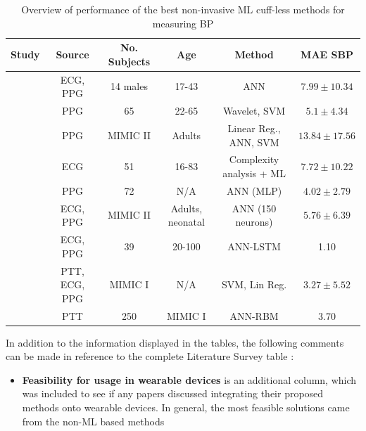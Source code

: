 \begin{landscape}
    \begin{table}[H]
        \caption{Overview of performance of  the best non-invasive ML cuff-less methods for measuring BP}
        \begin{tabular}{|c|c|c|c|c|c|}
        \hline
        \textbf{Study} & \textbf{Source} & \textbf{No. Subjects} & \textbf{Age} & \textbf{Method} & \textbf{MAE SBP} \\ \hline
        \cite{Yang2020} & ECG, PPG & 14 males & 17-43 & ANN & $7.99 \pm 10.34$\\
        \cite{Gao2016} & PPG & 65 & 22-65 & Wavelet, SVM & $5.1 \pm 4.34$\\
        \cite{Kachuee2015} & PPG & MIMIC II & Adults & Linear Reg., ANN, SVM &  $13.84\pm  17.56$\\
        \cite{Simjanoska20182} & ECG & 51 & 16-83 & Complexity analysis + ML &  $7.72 \pm  10.22$\\ 
        \cite{Wang2018} & PPG & 72 & N/A & ANN (MLP) & $4.02 \pm 2.79$\\
        \cite{Pradenas2020} & ECG, PPG & MIMIC II & Adults,  neonatal & ANN (150 neurons) & $5.76 \pm 6.39$\\
        \cite{Tanveer2018} & ECG, PPG & 39 & 20-100 & ANN-LSTM & 1.10\\
        \cite{Chen2019} & PTT, ECG, PPG & MIMIC I & N/A & SVM, Lin Reg. & $3.27 \pm 5.52$\\ 
        \cite{Ripoll2019} & PTT & 250 & MIMIC I & ANN-RBM & 3.70\\\hline
        \end{tabular}
        \label{litsurveytab2}
    \end{table}
\end{landscape}\noindent In addition to the information displayed in the tables, the following 
comments can be made in reference to the complete Literature Survey table \cite{LitSurvey}:
\begin{itemize}
    \item \textbf{Feasibility for usage in wearable devices} is an additional column, which was included to see if any papers discussed integrating their proposed methods onto wearable devices. In general, the most feasible solutions came from the non-ML based methods
\end{itemize}

